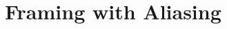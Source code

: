 \documentclass{article}
\begin{document}

\newpage
\section{Framing with Aliasing}



\end{document}
